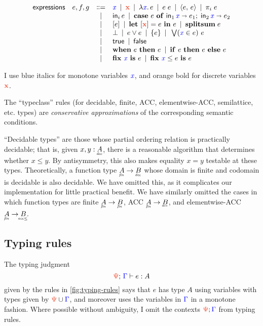 \documentclass{rntz}
\begin{document}
\[\begin{array}{rccl}
  \textsf{expressions} & e,f,g
  &\bnfeq& \m{x} \pipe \d{x} \pipe \lam{\m{x}} e \pipe e\; e
  \pipe \pair{e}{e} \pipe \pi_i\; e\\
  &&\pipe& \inj{i}{e} \pipe \case{e}{\m{x}}{e_1}{\m{x}}{e_2}\\
  &&\pipe& \disc{e} \pipe \letdisc{\d{x}}{e}{e} \pipe \splitsum{e}\\
  &&\pipe& \unit \pipe e \vee e \pipe \single{e} \pipe \setelim{\m{x}}{e}{e}\\
  &&\pipe& \etrue \pipe \efalse\\
  &&\pipe& \when{e}{e} \pipe \ifthen{e}{e}{e}\\
  &&\pipe& \fix{\m{x}}{e} \pipe \fixle{\m{x}}{e}{e}
\end{array}
\]

I use blue italics for monotone variables $\mathit{{\color{blue}{x}}}$, and orange bold for discrete variables $\d{x}$.

The ``typeclass'' rules (for decidable, finite, ACC, elementwise-ACC, semilattice, etc.\! types) are \emph{conservative approximations} of the corresponding semantic conditions.

``Decidable types'' are those whose partial ordering relation is practically decidable; that is, given $x, y : \eq{A}$, there is a reasonable algorithm that determines whether $x \le y$.
%
By antisymmetry, this also makes equality $x = y$ testable at these types. Theoretically, a function type $\under{fin}{A} \to \eq{B}$ whose domain is finite and codomain is decidable is also decidable.
%
We have omitted this, as it complicates our implementation for little practical
benefit.
%
We have similarly omitted the cases in which function types are finite $\fin{A} \to \fin{B}$, ACC $\fin{A} \to \acc{B}$, and elementwise-ACC $\fin{A} \to \eltacc{B}$.


\subsection{Typing rules}

The typing judgment \[\J{\GP}{\GG}{e}{A}\] given by the rules in
\cref{fig:typing-rules} says that $e$ has type $A$ using variables with types
given by $\dt{\GP} \cup \mt{\GG}$, and moreover uses the variables in ${\color{blue}{\Gamma}}$
in a monotone fashion.
%
Where possible without ambiguity, I omit the contexts $\dt{\GP};\mt{\GG}$ from typing rules.
\end{document}
